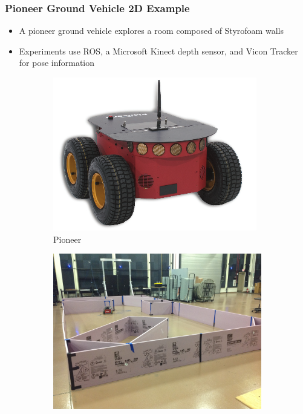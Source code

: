 \documentclass[11pt,professionalfonts,hyperref={pdftex,pdfpagemode=none,pdfstartview=FitH}]{beamer}
\begin{document}
\begin{frame}
\frametitle{Pioneer Ground Vehicle 2D Example}
\begin{itemize}
        	\item A pioneer ground vehicle explores a room composed of Styrofoam walls
	\item Experiments use ROS, a Microsoft Kinect depth sensor, and Vicon Tracker for pose information
\end{itemize}
\begin{figure}
	\centering
    	\begin{subfigure}[b]{0.28\textwidth}
        		\includegraphics[width=\textwidth]{pioneer.png}
        		\caption*{Pioneer}
    	\end{subfigure}    	
	\hspace*{0.04\textwidth}
	\begin{subfigure}[b]{0.28\textwidth}
        		\includegraphics[width=\textwidth]{test_setup_1.jpg}

\end{subfigure}
\end{figure}
\end{frame}
\end{document}
